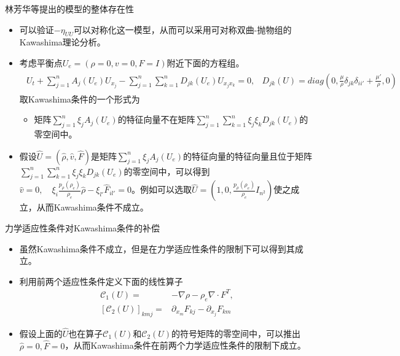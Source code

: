 \documentclass[mathserif]{beamer}
\begin{document}
\begin{frame}{林芳华等提出的模型的整体存在性}
\begin{itemize}
\item<2-> 可以验证$-\eta_{UU}$可以对称化这一模型，从而可以采用可对称双曲-抛物组的Kawashima理论分析。
\item<3-> 考虑平衡点$U_e=(\rho=0,v=0,F=I)$附近下面的方程组。%
\begin{eqnarray*}%
  \begin{smallmatrix} U_t + \sum_{j=1}^n A_j(U_e) U_{x_j} -\sum_{j=1}^n \sum_{k=1}^n D_{jk}(U_e) U_{x_j x_k}=  0, &  D_{jk}(U) =diag(0,\frac{\mu}{\rho} \delta_{jk} \delta_{ii'} + \frac{\mu'}{\rho} ,0) %
  \end{smallmatrix}
\end{eqnarray*}
取Kawashima条件的一个形式为
\begin{itemize}
    \item 矩阵$ \sum_{j=1}^n \xi_j A_j(U_e)$的特征向量不在矩阵$\sum_{j=1}^n \sum_{k=1}^n \xi_j \xi_k D_{jk}(U_e)$的零空间中。
\end{itemize}
\item<4-> 假设$\hat{U} = (\hat{\rho}, \hat{ v },\hat{F})$是矩阵$ \sum_{j=1}^n \xi_j A_j(U_e)$的特征向量的特征向量且位于矩阵$\sum_{j=1}^n \sum_{k=1}^n  \xi_j \xi_k D_{jk}(U_e)$的零空间中，可以得到$\hat{ v }=0, \quad \xi_i \frac{p_\rho(\rho_e)}{\rho_e} \hat{\rho} - \xi_{l'} \hat{F}_{il'} = 0$。例如可以选取$\hat{U} = (1,0,\frac{p_\rho(\rho_e)}{\rho_e} I_{n^2})$使之成立，从而Kawashima条件不成立。
\end{itemize}
\end{frame}

\begin{frame}{力学适应性条件对Kawashima条件的补偿}
\begin{itemize}
\item<2-> 虽然Kawashima条件不成立，但是在力学适应性条件的限制下可以得到其成立。
\item<3-> 利用前两个适应性条件定义下面的线性算子
 \begin{eqnarray*}%
 {\mathcal C}_1(U) = & -\nabla\rho - \rho_e \nabla\cdot F^T, \nonumber \\
 {[{\mathcal C}_2(U)]}_{kmj} = & \partial_{x_m} F_{kj} - \partial_{x_j} F_{km}
 \end{eqnarray*}
\item<4-> 假设上面的$\hat{U}$也在算子${\mathcal C}_1(U)$和${\mathcal C}_2(U)$的符号矩阵的零空间中，可以推出$\hat{\rho}=0,\hat{F}=0$，从而Kawashima条件在前两个力学适应性条件的限制下成立。
\end{itemize}
\end{frame}
\end{document}
